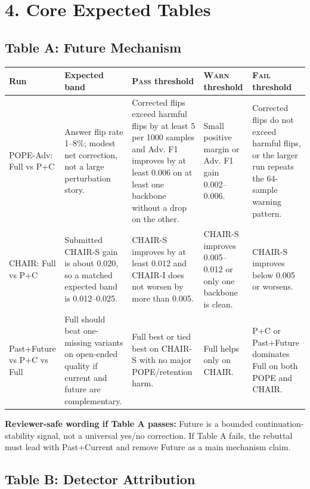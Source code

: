 \documentclass[10pt]{article}
\newcommand{\pass}{\textsc{Pass}}
\newcommand{\warn}{\textsc{Warn}}
\newcommand{\fail}{\textsc{Fail}}
\begin{document}
\section*{4. Core Expected Tables}

\subsection*{Table A: Future Mechanism}

\begin{tabularx}{\textwidth}{@{}p{}p{}Y Y Y@{}}
\toprule
Run & Expected band & \pass{} threshold & \warn{} threshold & \fail{} threshold \\
\midrule
POPE-Adv: Full vs P+C & Answer flip rate 1--8\%; modest net correction, not a large perturbation story. & Corrected flips exceed harmful flips by at least 5 per 1000 samples and Adv. F1 improves by at least 0.006 on at least one backbone without a drop on the other. & Small positive margin or Adv. F1 gain 0.002--0.006. & Corrected flips do not exceed harmful flips, or the larger run repeats the 64-sample warning pattern. \\
CHAIR: Full vs P+C & Submitted CHAIR-S gain is about 0.020, so a matched expected band is 0.012--0.025. & CHAIR-S improves by at least 0.012 and CHAIR-I does not worsen by more than 0.005. & CHAIR-S improves 0.005--0.012 or only one backbone is clean. & CHAIR-S improves below 0.005 or worsens. \\
Past+Future vs P+C vs Full & Full should beat one-missing variants on open-ended quality if current and future are complementary. & Full best or tied best on CHAIR-S with no major POPE/retention harm. & Full helps only on CHAIR. & P+C or Past+Future dominates Full on both POPE and CHAIR. \\
\bottomrule
\end{tabularx}

\textbf{Reviewer-safe wording if Table A passes:} Future is a bounded continuation-stability signal, not a universal yes/no correction. If Table A fails, the rebuttal must lead with Past+Current and remove Future as a main mechanism claim.

\subsection*{Table B: Detector Attribution}
\end{document}
